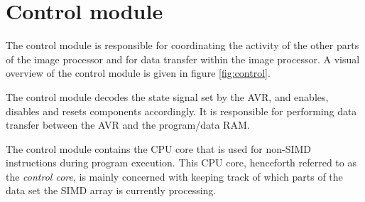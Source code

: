 \section{Control module}

The control module is responsible for coordinating the activity of the
other parts of the image processor and for data transfer within the
image processor. A visual overview of the control module is given in
figure \ref{fig:control}.

The control module decodes the state signal set by the AVR, and enables,
disables and resets components accordingly. It is responsible for
performing data transfer between the AVR and the program/data RAM.

The control module contains the CPU core that is used for non-SIMD
instructions during program execution. This CPU core, henceforth
referred to as the \emph{control core}, is mainly concerned with keeping
track of which parts of the data set the SIMD array is currently
processing.

